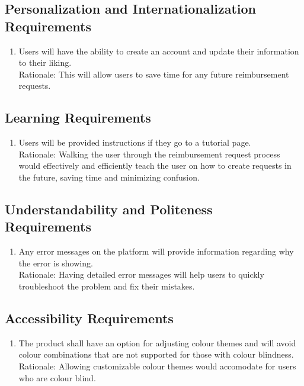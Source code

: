 \documentclass[12pt]{article}
\begin{document}
\subsection{Personalization and Internationalization Requirements}

\begin{enumerate}
  
  \item Users will have the ability to create an account and update their information to their liking. \\
  Rationale: This will allow users to save time for any future reimbursement requests.
\end{enumerate}
\subsection{Learning Requirements}

\begin{enumerate}
  \item Users will be provided instructions if they go to a tutorial page. \\
  Rationale: Walking the user through the reimbursement request process would effectively and efficiently teach the user on how to create requests in the future, saving time and minimizing confusion.
  
\end{enumerate}
\subsection{Understandability and Politeness Requirements}

\begin{enumerate}
  \item Any error messages on the platform will provide information regarding why the error is showing. \\
  Rationale: Having detailed error messages will help users to quickly troubleshoot the problem and fix their mistakes.
\end{enumerate}
\subsection{Accessibility Requirements}

\begin{enumerate}
  \item The product shall have an option for adjusting colour themes and will avoid colour combinations that are not supported for those with colour blindness. \\
  Rationale: Allowing customizable colour themes would accomodate for users who are colour blind.
\end{enumerate}
\end{document}
